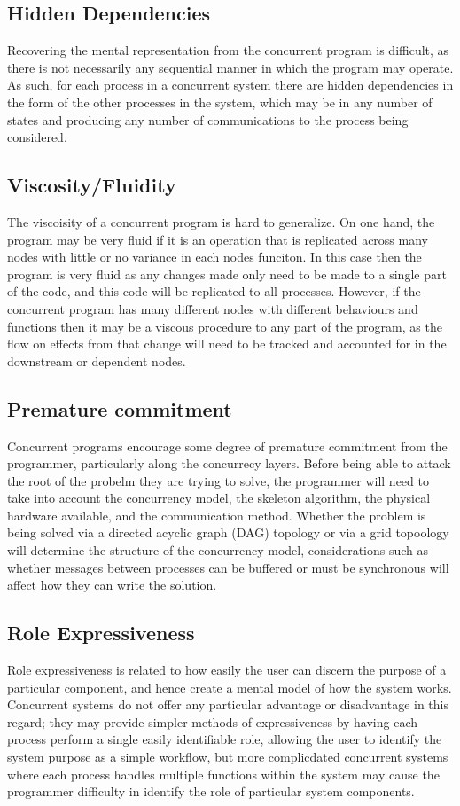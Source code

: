 \documentclass{sig-alternate}
\begin{document}
\subsection{Hidden Dependencies}

Recovering the mental representation from the concurrent program is difficult, as there is not necessarily any sequential manner in which the program may operate. As such, for each process in a concurrent system there are hidden dependencies in the form of the other processes in the system, which may be in any number of states and producing any number of communications to the process being considered.

\subsection{Viscosity/Fluidity}
The viscoisity of a concurrent program is hard to generalize. On one hand, the program may be very fluid if it is an operation that is replicated across many nodes with little or no variance in each nodes funciton. In this case then the program is very fluid as any changes made only need to be made to a single part of the code, and this code will be replicated to all processes. However, if the concurrent program has many different nodes with different behaviours and functions then it may be a viscous procedure to any part of the program, as the flow on effects from that change will need to be tracked and accounted for in the downstream or dependent nodes.

\subsection{Premature commitment}
Concurrent programs encourage some degree of premature commitment from the programmer, particularly along the concurrecy layers. Before being able to attack the root of the probelm they are trying to solve, the programmer will need to take into account the concurrency model, the skeleton algorithm, the physical hardware available, and the communication method. Whether the problem is being solved via a directed acyclic graph (DAG) topology or via a grid topoology will determine the structure of the concurrency model, considerations such as whether messages between processes can be buffered or must be synchronous will affect how they can write the solution.

\subsection{Role Expressiveness}
Role expressiveness is related to how easily the user can discern the purpose of a particular component, and hence create a mental model of how the system works. Concurrent systems do not offer any particular advantage or disadvantage in this regard; they may provide simpler methods of expressiveness by having each process perform a single easily identifiable role, allowing the user to identify the system purpose as a simple workflow, but more complicdated concurrent systems where each process handles multiple functions within the system may cause the programmer difficulty in identify the role of particular system components. 
\end{document}
